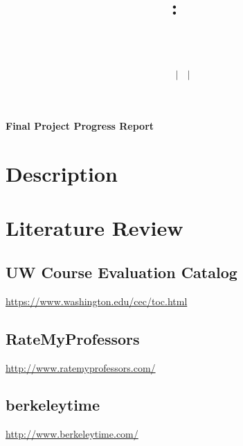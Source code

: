 \documentclass{article}
\title{
    \vspace{2in}
    \textmd{\textbf{\hmwkClass:\ \hmwkTitle}}\\
    \vspace{0.2in}\large{\textit{\hmwkClassInstructor\ \hmwkClassTime}}\\
    \author{\textbf{\hmwkAuthorName\ $\vert$ \hmwkAuthorCSE\ $\vert$ \hmwkAuthorId}}
}
\date{}
\begin{document}
\begin{center}
\LARGE
\textbf{Final Project Progress Report}
\end{center}

\section{Description}

\section{Literature Review}

\subsection{UW Course Evaluation Catalog}
{\color{blue} \href{https://www.washington.edu/cec/toc.html}{https://www.washington.edu/cec/toc.html}}

\subsection{RateMyProfessors \cite{ratemyprofessors}}
{\color{blue} \href{http://www.ratemyprofessors.com/}{http://www.ratemyprofessors.com/}}

\subsection{berkeleytime \cite{berkeleytime}}
{\color{blue} \href{http://www.berkeleytime.com/}{http://www.berkeleytime.com/}}



\end{document}
